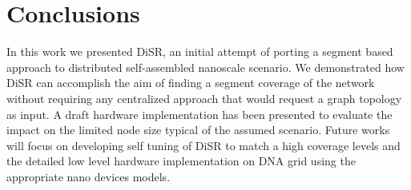 \documentclass[final,journal]{IEEEtran}
\newcommand{\disr}{{\sf DiSR}}
\begin{document}







\section{Conclusions}
In this work we presented \disr{}, an initial attempt of porting a segment based
approach to distributed self-assembled nanoscale scenario. We
demonstrated how \disr{} can accomplish the aim of finding a segment
coverage of the network without requiring any centralized approach
that would request a graph topology as input. A draft hardware
implementation has been presented to evaluate the impact on the limited
node size typical of the assumed scenario. Future works will focus on
developing self tuning of \disr{} to match a high coverage levels and the
detailed low level hardware implementation on
DNA grid using the appropriate nano devices models.


\balance

 


\end{document}
